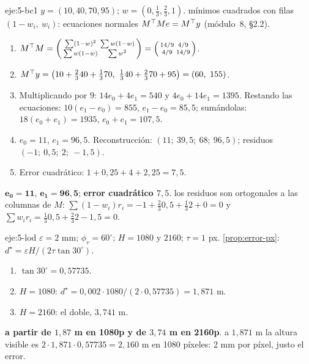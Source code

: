 \begin{solucion}{eje:5-bc1}
\datos $y=(10,40,70,95)$; $w=(0,\tfrac13,\tfrac23,1)$.
\planteamiento mínimos cuadrados con filas $(1-w_i,\ w_i)$: ecuaciones normales $M^\top Me=M^\top y$ (módulo~8, §2.2).
\pasos
\begin{enumerate}[label=\arabic*.]
  \item $M^\top M=\begin{psmallmatrix}\sum(1-w)^2&\sum w(1-w)\\ \sum w(1-w)&\sum w^2\end{psmallmatrix}=\begin{psmallmatrix}14/9&4/9\\4/9&14/9\end{psmallmatrix}$.
  \item $M^\top y=\bigl(10+\tfrac23 40+\tfrac13 70,\ \tfrac13 40+\tfrac23 70+95\bigr)=(60,\ 155)$.
  \item Multiplicando por 9: $14e_0+4e_1=540$ y $4e_0+14e_1=1395$. Restando las ecuaciones: $10(e_1-e_0)=855$, $e_1-e_0=85{,}5$; sumándolas: $18(e_0+e_1)=1935$, $e_0+e_1=107{,}5$.
  \item $e_0=11$, $e_1=96{,}5$. Reconstrucción: $(11;\ 39{,}5;\ 68;\ 96{,}5)$; residuos $(-1;\ 0{,}5;\ 2;\ -1{,}5)$.
  \item Error cuadrático: $1+0{,}25+4+2{,}25=7{,}5$.
\end{enumerate}
\resultado $\mathbf{e_0=11}$, $\mathbf{e_1=96{,}5}$; \textbf{error cuadrático $7{,}5$}.
\comprobacion los residuos son ortogonales a las columnas de $M$: $\sum(1-w_i)r_i=-1+\tfrac23 0{,}5+\tfrac13 2+0=0$ y $\sum w_ir_i=\tfrac13 0{,}5+\tfrac23 2-1{,}5=0$.
\end{solucion}

\begin{solucion}{eje:5-lod}
\datos $\varepsilon=2$ mm; $\phi_v=60^\circ$; $H=1080$ y $2160$; $\tau=1$ px.
\planteamiento \cref{prop:error-px}: $d^\star=\varepsilon H/(2\tau\tan 30^\circ)$.
\pasos
\begin{enumerate}[label=\arabic*.]
  \item $\tan 30^\circ=0{,}57735$.
  \item $H=1080$: $d^\star=0{,}002\cdot 1080/(2\cdot 0{,}57735)=1{,}871$ m.
  \item $H=2160$: el doble, $3{,}741$ m.
\end{enumerate}
\resultado \textbf{a partir de $1{,}87$ m en 1080p y de $3{,}74$ m en 2160p}.
\comprobacion a $1{,}871$ m la altura visible es $2\cdot 1{,}871\cdot 0{,}57735=2{,}160$ m en 1080 píxeles: 2 mm por píxel, justo el error.
\end{solucion}

